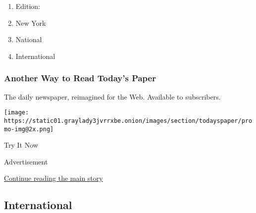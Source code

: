 \begin{enumerate}
\def\labelenumi{\arabic{enumi}.}
\tightlist
\item
  Edition:
\item
  New York
\item
  National
\item
  International
\end{enumerate}

\href{http://app.nytimes3xbfgragh.onion/todayspaper}{}

\hypertarget{another-way-to-read-todays-paper}{%
\subsubsection{Another Way to Read Today's
Paper}\label{another-way-to-read-todays-paper}}

The daily newspaper, reimagined for the Web. Available to subscribers.

\texttt{[image: https://static01.graylady3jvrrxbe.onion/images/section/todayspaper/promo-img@2x.png]}

Try It Now

Advertisement

\protect\hyperlink{after-mid1}{Continue reading the main story}

\hypertarget{international}{%
\subsection{International}\label{international}}


